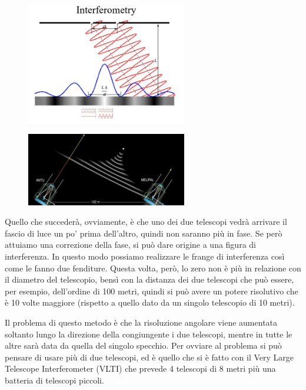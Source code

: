 \begin{minipage}{0.5\textwidth}
    \begin{figure}[H]
        \centering
        \includegraphics[width=7cm]{28.jpg}
    \end{figure}
\end{minipage}
\begin{minipage}{0.5\textwidth}
    \begin{figure}[H]
        \centering
        \includegraphics[width=7cm]{29.jpg}
    \end{figure}
\end{minipage}

Quello che succederà, ovviamente, è che uno dei due telescopi vedrà arrivare il fascio di luce un po' prima dell'altro, quindi non saranno più in fase. Se però attuiamo una correzione della fase, si può dare origine a una figura di interferenza. In questo modo possiamo realizzare le frange di interferenza così come le fanno due fenditure. Questa volta, però, lo zero non è più in relazione con il diametro del telescopio, bensì con la distanza dei due telescopi che può essere, per esempio, dell'ordine di 100 metri, quindi si può avere un potere risolutivo che è 10 volte maggiore (rispetto a quello dato da un singolo telescopio di 10 metri).

Il problema di questo metodo è che la risoluzione angolare viene aumentata soltanto lungo la direzione della congiungente i due telescopi, mentre in tutte le altre sarà data da quella del singolo specchio. Per ovviare al problema si può pensare di usare più di due telescopi, ed è quello che si è fatto con il Very Large Telescope Interferometer (VLTI) che prevede 4 telescopi di 8 metri più una batteria di telescopi piccoli.

